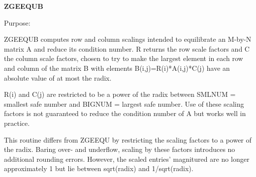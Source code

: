 {\bfseries Z\+G\+E\+E\+Q\+U\+B} 

 \begin{DoxyParagraph}{Purpose\+: }
\begin{DoxyVerb} ZGEEQUB computes row and column scalings intended to equilibrate an
 M-by-N matrix A and reduce its condition number.  R returns the row
 scale factors and C the column scale factors, chosen to try to make
 the largest element in each row and column of the matrix B with
 elements B(i,j)=R(i)*A(i,j)*C(j) have an absolute value of at most
 the radix.

 R(i) and C(j) are restricted to be a power of the radix between
 SMLNUM = smallest safe number and BIGNUM = largest safe number.  Use
 of these scaling factors is not guaranteed to reduce the condition
 number of A but works well in practice.

 This routine differs from ZGEEQU by restricting the scaling factors
 to a power of the radix.  Baring over- and underflow, scaling by
 these factors introduces no additional rounding errors.  However, the
 scaled entries' magnitured are no longer approximately 1 but lie
 between sqrt(radix) and 1/sqrt(radix).\end{DoxyVerb}
 
\end{DoxyParagraph}

